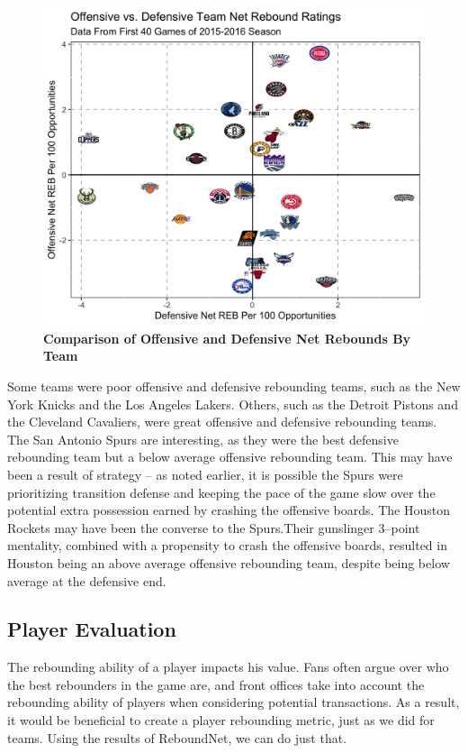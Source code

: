 \documentclass{article}
\begin{document}
\begin{figure}[htb]
\centering
\includegraphics[width=.8\columnwidth]{TeamsPlot.png}
\caption{\bf{Comparison of Offensive and Defensive Net Rebounds By Team}}
\label{fig:TeamsPlot}
\end{figure}

\noindent
Some teams were poor offensive and defensive rebounding teams, such as the New York Knicks and the Los Angeles Lakers. Others, such as the Detroit Pistons and the Cleveland Cavaliers, were great offensive and defensive rebounding teams. The San Antonio Spurs are interesting, as they were the best defensive rebounding team but a below average offensive rebounding team. This may have been a result of strategy -- as noted earlier, it is possible the Spurs were prioritizing transition defense and keeping the pace of the game slow over the potential extra possession earned by crashing the offensive boards. The Houston Rockets may have been the converse to the Spurs.Their gunslinger 3--point mentality, combined with a propensity to crash the offensive boards, resulted in Houston being an above average offensive rebounding team, despite being below average at the defensive end.

\subsection{Player Evaluation}
\bigbreak
\noindent
The rebounding ability of a player impacts his value. Fans often argue over who the best rebounders in the game are, and front offices take into account the rebounding ability of players when considering potential transactions. As a result, it would be beneficial to create a player rebounding metric, just as we did for teams. Using the results of ReboundNet, we can do just that.
\end{document}
